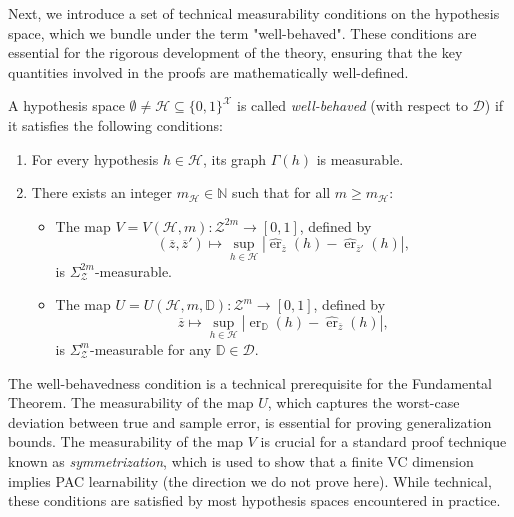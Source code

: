 Next, we introduce a set of technical measurability conditions on the hypothesis space, which we bundle under the term "well-behaved". These conditions are essential for the rigorous development of the theory, ensuring that the key quantities involved in the proofs are mathematically well-defined.

\begin{definition}
    \label{def:well-behaved}
    A hypothesis space $\emptyset \neq \mathcal{H} \subseteq \{0,1\}^\mathcal{X}$ is called \emph{well-behaved} (with respect to $\mathcal{D}$) if it satisfies the following conditions:
    \begin{enumerate}
        \item For every hypothesis $h \in \mathcal{H}$, its graph $\Gamma(h)$ is measurable.
        \item There exists an integer $m_{\mathcal{H}} \in \mathbb{N}$ such that for all $m \ge m_{\mathcal{H}}$:
        \begin{itemize}
            \item The map $V = V(\mathcal{H}, m): \mathcal{Z}^{2m} \to [0,1]$, defined by
            \[
                (\overline{z}, \overline{z}') \mapsto \sup_{h \in \mathcal{H}} |\hat{\operatorname{er}}_{\overline{z}}(h) - \hat{\operatorname{er}}_{\overline{z}'}(h)|,
            \]
            is $\Sigma_{\mathcal{Z}}^{2m}$-measurable.
            \item The map $U = U(\mathcal{H}, m, \mathbb{D}): \mathcal{Z}^m \to [0,1]$, defined by
            \[
                \overline{z} \mapsto \sup_{h \in \mathcal{H}} |\operatorname{er}_{\mathbb{D}}(h) - \hat{\operatorname{er}}_{\overline{z}}(h)|,
            \]
            is $\Sigma_{\mathcal{Z}}^m$-measurable for any $\mathbb{D} \in \mathcal{D}$.
        \end{itemize}
    \end{enumerate}
\end{definition}

The well-behavedness condition is a technical prerequisite for the Fundamental Theorem. The measurability of the map $U$, which captures the worst-case deviation between true and sample error, is essential for proving generalization bounds. The measurability of the map $V$ is crucial for a standard proof technique known as \emph{symmetrization}, which is used to show that a finite VC dimension implies PAC learnability (the direction we do not prove here). While technical, these conditions are satisfied by most hypothesis spaces encountered in practice.

